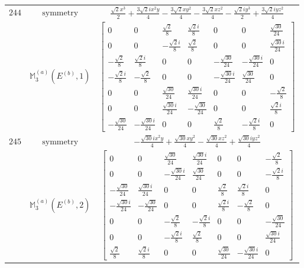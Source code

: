 \documentclass[fleqn,8pt,landscape]{jsarticle}
\begin{document}
\begin{longtable}{ccc}
$ 244 $ & $ \text{symmetry} $ & $ \frac{\sqrt{2} x^{3}}{2} + \frac{3 \sqrt{2} i x^{2} y}{4} - \frac{3 \sqrt{2} x y^{2}}{4} - \frac{3 \sqrt{2} x z^{2}}{4} - \frac{\sqrt{2} i y^{3}}{2} + \frac{3 \sqrt{2} i y z^{2}}{4} $ \\
$  $ & $ \mathbb{M}_{3}^{(a)}(E^{(b)},1) $ & $ \begin{bmatrix} 0 & 0 & \frac{\sqrt{2}}{8} & \frac{\sqrt{2} i}{8} & 0 & 0 & \frac{\sqrt{30}}{24} \\ 0 & 0 & - \frac{\sqrt{2} i}{8} & \frac{\sqrt{2}}{8} & 0 & 0 & \frac{\sqrt{30} i}{24} \\ - \frac{\sqrt{2}}{8} & \frac{\sqrt{2} i}{8} & 0 & 0 & - \frac{\sqrt{30}}{24} & - \frac{\sqrt{30} i}{24} & 0 \\ - \frac{\sqrt{2} i}{8} & - \frac{\sqrt{2}}{8} & 0 & 0 & - \frac{\sqrt{30} i}{24} & \frac{\sqrt{30}}{24} & 0 \\ 0 & 0 & \frac{\sqrt{30}}{24} & \frac{\sqrt{30} i}{24} & 0 & 0 & - \frac{\sqrt{2}}{8} \\ 0 & 0 & \frac{\sqrt{30} i}{24} & - \frac{\sqrt{30}}{24} & 0 & 0 & \frac{\sqrt{2} i}{8} \\ - \frac{\sqrt{30}}{24} & - \frac{\sqrt{30} i}{24} & 0 & 0 & \frac{\sqrt{2}}{8} & - \frac{\sqrt{2} i}{8} & 0 \end{bmatrix} $ \\ \hline
$ 245 $ & $ \text{symmetry} $ & $ - \frac{\sqrt{30} i x^{2} y}{4} + \frac{\sqrt{30} x y^{2}}{4} - \frac{\sqrt{30} x z^{2}}{4} + \frac{\sqrt{30} i y z^{2}}{4} $ \\
$  $ & $ \mathbb{M}_{3}^{(a)}(E^{(b)},2) $ & $ \begin{bmatrix} 0 & 0 & \frac{\sqrt{30}}{24} & \frac{\sqrt{30} i}{24} & 0 & 0 & - \frac{\sqrt{2}}{8} \\ 0 & 0 & - \frac{\sqrt{30} i}{24} & \frac{\sqrt{30}}{24} & 0 & 0 & - \frac{\sqrt{2} i}{8} \\ - \frac{\sqrt{30}}{24} & \frac{\sqrt{30} i}{24} & 0 & 0 & \frac{\sqrt{2}}{8} & \frac{\sqrt{2} i}{8} & 0 \\ - \frac{\sqrt{30} i}{24} & - \frac{\sqrt{30}}{24} & 0 & 0 & \frac{\sqrt{2} i}{8} & - \frac{\sqrt{2}}{8} & 0 \\ 0 & 0 & - \frac{\sqrt{2}}{8} & - \frac{\sqrt{2} i}{8} & 0 & 0 & - \frac{\sqrt{30}}{24} \\ 0 & 0 & - \frac{\sqrt{2} i}{8} & \frac{\sqrt{2}}{8} & 0 & 0 & \frac{\sqrt{30} i}{24} \\ \frac{\sqrt{2}}{8} & \frac{\sqrt{2} i}{8} & 0 & 0 & \frac{\sqrt{30}}{24} & - \frac{\sqrt{30} i}{24} & 0 \end{bmatrix} $ \\ \hline

\end{longtable}
\end{document}
